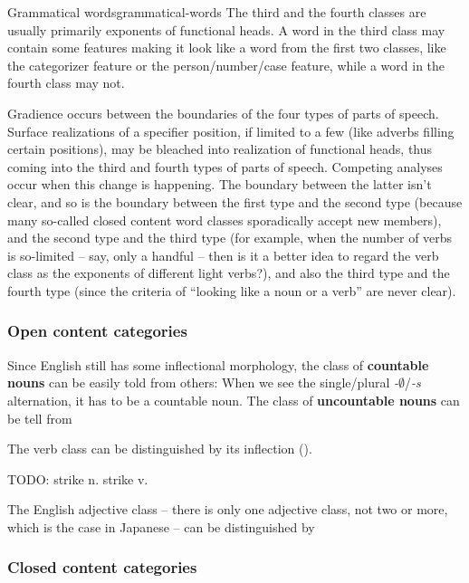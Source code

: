 \documentclass[UTF8, a4paper, oneside, scheme=plain]{ctexrep}
\newcommand*{\concept}[1]{\textbf{#1}}
\newcommand{\corpus}[1]{\emph{#1}}
\newcommand{\emptymorpheme}{$\emptyset$}
\begin{document}
\begin{theorybox}{Grammatical words}{grammatical-words}
    The third and the fourth classes are usually primarily exponents of functional heads.
    A word in the third class may contain some features making it look like a word from the first two classes,
    like the categorizer feature or the person/number/case feature,
    while a word in the fourth class may not.

    Gradience occurs between the boundaries of the four types of parts of speech.
    Surface realizations of a specifier position,
    if limited to a few (like adverbs filling certain positions),
    may be bleached into realization of functional heads,
    thus coming into the third and fourth types of parts of speech.
    Competing analyses occur when this change is happening.
    The boundary between the latter isn't clear,
    and so is the boundary between the first type and the second type
    (because many so-called closed content word classes 
    sporadically accept new members),
    and the second type and the third type
    (for example, when the number of verbs is so-limited -- say, only a handful -- 
    then is it a better idea to regard the verb class as the exponents of different light verbs?),
    and also the third type and the fourth type
    (since the criteria of ``looking like a noun or a verb'' are never clear).
\end{theorybox}

\subsubsection{Open content categories}

Since English still has some inflectional morphology,
the class of \concept{countable nouns} can be easily told from others:
When we see the single/plural \corpus{-\emptymorpheme}/\corpus{-s} alternation, it has to be a countable noun.
The class of \concept{uncountable nouns} can be tell from 

The verb class can be distinguished by its inflection (). 

TODO: strike n. strike v.

The English adjective class -- there is only one adjective class, not two or more,
which is the case in Japanese -- 
can be distinguished by 

\subsubsection{Closed content categories}
\end{document}
